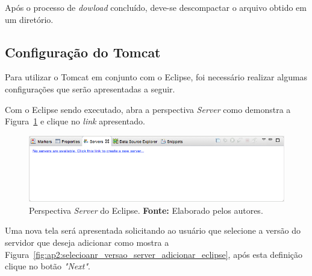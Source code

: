 Após o processo de \textit{dowload} concluído, deve-se descompactar o arquivo obtido em um diretório.

\subsection*{Configuração do Tomcat}

Para utilizar o Tomcat em conjunto com o Eclipse, foi necessário realizar algumas configurações que serão apresentadas a seguir.

Com o Eclipse sendo executado, abra a perspectiva \textit{Server} como demonstra a Figura~\ref{fig:ap2:perspectiva_server_no_server_eclipse} e clique no \textit{link} apresentado.

\captionsetup[figure]{list=no}
\begin{figure}[h!]
	\centerline{\includegraphics[scale=0.5]{./imagens/apendices/perspectiva-server-sem-servidor.png}}
	\caption[Perspectiva \textit{Server} do Eclipse.]
	{Perspectiva \textit{Server} do Eclipse. \textbf{Fonte:} Elaborado pelos autores.}
	\label{fig:ap2:perspectiva_server_no_server_eclipse}
\end{figure}

Uma nova tela será apresentada solicitando ao usuário que selecione a versão do servidor que deseja adicionar como mostra a Figura~\ref{fig:ap2:selecioanr_versao_server_adicionar_eclipse}, após esta definição clique no botão \textit{"Next"}.

